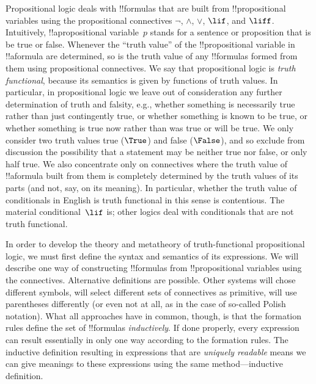 \documentclass[../../../include/open-logic-section]{subfiles}
\begin{document}


Propositional logic deals with !!{formula}s that are built from
!!{propositional variable}s using the propositional connectives
$\lnot$, $\land$, $\lor$, $\lif$, and $\liff$.  Intuitively,
!!a{propositional variable}~$p$ stands for a sentence or proposition
that is be true or false. Whenever the ``truth value'' of the
!!{propositional variable} in !!a{formula} are determined, so is the
truth value of any !!{formula}s formed from them using propositional
connectives.  We say that propositional logic is \emph{truth
  functional}, because its semantics is given by functions of truth
values. In particular, in propositional logic we leave out of
consideration any further determination of truth and falsity, e.g.,
whether something is necessarily true rather than just contingently
true, or whether something is known to be true, or whether something
is true now rather than was true or will be true.  We only consider
two truth values true ($\True$) and false ($\False$), and so exclude
from discussion the possibility that a statement may be neither true
nor false, or only half true. We also concentrate only on connectives where
the truth value of !!a{formula} built from them is completely
determined by the truth values of its parts (and not, say, on its
meaning). In particular, whether the truth value of conditionals in
English is truth functional in this sense is contentious. The material
conditional~$\lif$ is; other logics deal with conditionals that are
not truth functional.

In order to develop the theory and metatheory of truth-functional
propositional logic, we must first define the syntax and semantics of
its expressions.  We will describe one way of constructing
!!{formula}s from !!{propositional variable}s using the
connectives. Alternative definitions are possible. Other systems will
chose different symbols, will select different sets of connectives as
primitive, will use parentheses differently (or even not at all, as in
the case of so-called Polish notation).  What all approaches have in
common, though, is that the formation rules define the set of
!!{formula}s \emph{inductively}. If done properly, every expression
can result essentially in only one way according to the formation
rules.  The inductive definition resulting in expressions that are
\emph{uniquely readable} means we can give meanings to these
expressions using the same method---inductive definition.
\end{document}
